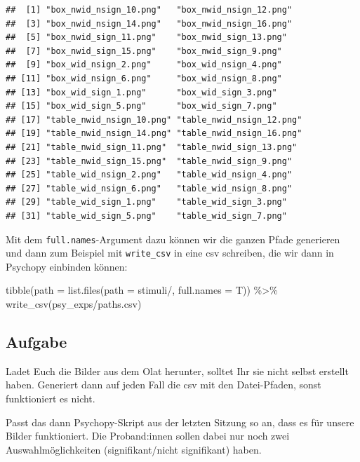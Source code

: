 \documentclass[
]{book}
\newenvironment{Shaded}{\begin{snugshade}}{\end{snugshade}}
\newcommand{\AttributeTok}[1]{\textcolor[rgb]{0.77,0.63,0.00}{#1}}
\newcommand{\FunctionTok}[1]{\textcolor[rgb]{0.00,0.00,0.00}{#1}}
\newcommand{\NormalTok}[1]{#1}
\newcommand{\SpecialCharTok}[1]{\textcolor[rgb]{0.00,0.00,0.00}{#1}}
\newcommand{\StringTok}[1]{\textcolor[rgb]{0.31,0.60,0.02}{#1}}
\begin{document}
\begin{verbatim}
##  [1] "box_nwid_nsign_10.png"   "box_nwid_nsign_12.png"  
##  [3] "box_nwid_nsign_14.png"   "box_nwid_nsign_16.png"  
##  [5] "box_nwid_sign_11.png"    "box_nwid_sign_13.png"   
##  [7] "box_nwid_sign_15.png"    "box_nwid_sign_9.png"    
##  [9] "box_wid_nsign_2.png"     "box_wid_nsign_4.png"    
## [11] "box_wid_nsign_6.png"     "box_wid_nsign_8.png"    
## [13] "box_wid_sign_1.png"      "box_wid_sign_3.png"     
## [15] "box_wid_sign_5.png"      "box_wid_sign_7.png"     
## [17] "table_nwid_nsign_10.png" "table_nwid_nsign_12.png"
## [19] "table_nwid_nsign_14.png" "table_nwid_nsign_16.png"
## [21] "table_nwid_sign_11.png"  "table_nwid_sign_13.png" 
## [23] "table_nwid_sign_15.png"  "table_nwid_sign_9.png"  
## [25] "table_wid_nsign_2.png"   "table_wid_nsign_4.png"  
## [27] "table_wid_nsign_6.png"   "table_wid_nsign_8.png"  
## [29] "table_wid_sign_1.png"    "table_wid_sign_3.png"   
## [31] "table_wid_sign_5.png"    "table_wid_sign_7.png"
\end{verbatim}

Mit dem \texttt{full.names}-Argument dazu können wir die ganzen Pfade generieren und dann zum Beispiel mit \texttt{write\_csv} in eine csv schreiben, die wir dann in Psychopy einbinden können:

\begin{Shaded}
\begin{Highlighting}[]
\FunctionTok{tibble}\NormalTok{(}\AttributeTok{path =} \FunctionTok{list.files}\NormalTok{(}\AttributeTok{path =} \StringTok{\textquotesingle{}stimuli/\textquotesingle{}}\NormalTok{, }\AttributeTok{full.names =}\NormalTok{ T)) }\SpecialCharTok{\%\textgreater{}\%} 
  \FunctionTok{write\_csv}\NormalTok{(}\StringTok{\textquotesingle{}psy\_exps/paths.csv\textquotesingle{}}\NormalTok{)}
\end{Highlighting}
\end{Shaded}

\hypertarget{aufgabe-14}{%
\subsection{Aufgabe}\label{aufgabe-14}}

Ladet Euch die Bilder aus dem Olat herunter, solltet Ihr sie nicht selbst erstellt haben.
Generiert dann auf jeden Fall die csv mit den Datei-Pfaden, sonst funktioniert es nicht.

Passt das dann Psychopy-Skript aus der letzten Sitzung so an, dass es für unsere Bilder funktioniert. Die Proband:innen sollen dabei nur noch zwei Auswahlmöglichkeiten (signifikant/nicht signifikant) haben.
\end{document}
